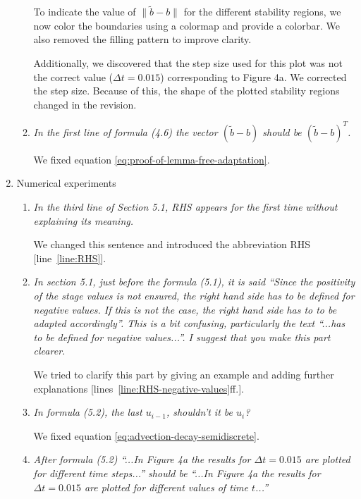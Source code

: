 \documentclass[11pt]{letter}
\begin{document}
\begin{letter}{}
\begin{enumerate}[label=\arabic*.]
\begin{enumerate}[label=\alph*)]
    To indicate the value of $\| \tilde b - b \|$ for the different stability
    regions, we now color the boundaries using a colormap and provide a colorbar.
	We also removed the filling pattern to improve clarity.

    Additionally, we discovered that the step size used for this plot was not
    the correct value ($\Delta t = 0.015$) corresponding to Figure 4a. We
    corrected the step size. Because of this,
    the shape of the plotted stability regions changed in the revision.
    


    \item \emph{%
    In the first line of formula (4.6) the vector $(\tilde b - b)$ should be
     $(\tilde b - b)^T$.
    }

    We fixed equation \eqref{eq:proof-of-lemma-free-adaptation}.
  \end{enumerate}


  \item Numerical experiments
  \begin{enumerate}[label=\alph*)]
    \item \emph{%
    In the third line of Section 5.1, RHS appears for the first time without
    explaining its meaning.
    }

    We changed this sentence and introduced the abbreviation RHS
    [line~\ref{line:RHS}].


    \item \emph{%
    In section 5.1, just before the formula (5.1), it is said ``Since the
    positivity of the stage values is not ensured, the right hand side has to be
    defined for negative values. If this is not the case, the right hand side
    has to to be adapted accordingly''. This is a bit confusing, particularly
    the text ``...has to be defined for negative values...''. I suggest that
    you make this part clearer.
    }

    We tried to clarify this part by giving an example and adding further
    explanations [lines~\ref{line:RHS-negative-values}ff.].


    \item \emph{%
    In formula (5.2), the last $u_{i-1}$, shouldn’t it be $u_i$?
    }

    We fixed equation \eqref{eq:advection-decay-semidiscrete}.


    \item \emph{%
    After formula (5.2) ``...In Figure 4a the results for $\Delta t = 0.015$
    are plotted for different time steps...'' should be ``...In Figure 4a the
    results for $\Delta t = 0.015$ are plotted for different values of time $t$...''
    }


\end{enumerate}
\end{enumerate}
\end{letter}
\end{document}
